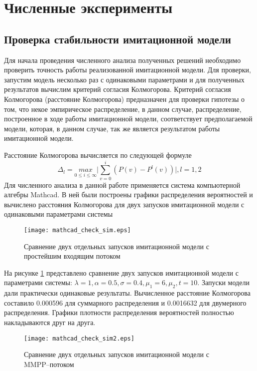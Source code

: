\section{Численные эксперименты}
\subsection{Проверка стабильности имитационной модели}
Для начала проведения численного анализа полученных решений необходимо проверить точность работы реализованной имитационной модели. Для проверки, запустим модель несколько раз с одинаковыми параметрами и для полученных результатов вычислим критерий согласия Колмогорова. Критерий согласия Колмогорова (расстояние Колмогорова) предназначен для проверки гипотезы о том, что некое эмпирическое распределение, в данном случае, распределение, построенное в ходе работы имитационной модели, соответствует предполагаемой модели, которая, в данном случае, так же является результатом работы имитационной модели.

Расстояние Колмогорова вычисляется по следующей формуле
\begin{equation*}
	\Delta_{l} = \underset{0 \leq i \leq \infty}{max}\bigg\rvert \sum_{v=0}^{i} (P(v) - P^{l}(v))\bigg\rvert, l = 1,2
\end{equation*}
Для численного анализа в данной работе применяется система компьютерной алгебры Mathcad. В ней были построены графики распределения вероятностей и вычислено расстояния Колмогорова для двух запусков имитационной модели с одинаковыми параметрами системы

\begin{figure}[H]
	\centering
	\texttt{[image: mathcad\_check\_sim.eps]}
	\caption{Сравнение двух отдельных запусков имитационной модели с простейшим входящим потоком}
	\label{experiments_kol_dist_sim}
\end{figure} 

На рисунке \ref{experiments_kol_dist_sim} представлено сравнение двух запусков имитационной модели с параметрами системы: $\lambda = 1, \alpha = 0.5, \sigma = 0.4, \mu_{1} = 6, \mu_{2}, t = 10 $. Запуски модели дали практически одинаковые результаты. Вычисленное расстояние Колмогорова составило  0.000596 для суммарного распределения и 0.0016632 для двумерного распределения. Графики плотности распределения вероятностей полностью накладываются друг на друга.

\begin{figure}[H]
	\centering
	\texttt{[image: mathcad\_check\_sim2.eps]}
	\caption{Сравнение двух отдельных запусков имитационной модели с MMPP--потоком}
	\label{experiments_kol_dist_sim2}
\end{figure} 


